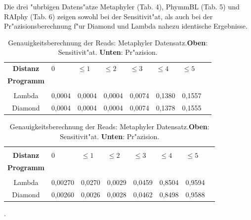 \documentclass[10pt, a4paper]{article}[08.12.2015]
\begin{document}
     Die drei "ubrbigen Datens"atze Metaphyler (Tab. 4), PhymmBL (Tab. 5) und RAIphy (Tab. 6) zeigen sowohl bei der Sensitivit"at, als auch bei der Pr"azisionsberechnung f"ur Diamond und Lambda nahezu identische Ergebnisse.
      \begin{table}[H]
        \begin{tabular}{clllllll}
          \textbf{Distanz}&0&$\leq1$&$\leq2$&$\leq3$&$\leq4$&$\leq5$\\
          \textbf{Programm}&&&&&\\ \hline  
          &&&&&&\\
          Lambda&0,0004&0,0004&0,0004&0,0074&0,1380&0,1557\\
          Diamond&0,0004&0,0004&0,0004&0,0074&0,1378&0,1555\\
        \end{tabular}

        \begin{tabular}{clllllll}
        &&&&&&\\
          \textbf{Distanz}&0&$\leq1$&$\leq2$&$\leq3$&$\leq4$&$\leq5$\\
          \textbf{Programm}&&&&&\\ \hline  
          &&&&&&\\
          Lambda&0,00270&0,0270&0,0029&0,0459&0,8504&0,9594\\
          Diamond&0,00260&0,0026&0,0028&0,0462&0,8498&0,9588\\
        \end{tabular}
        \caption[Genauigkeitsberechnung der Reads: Metaphyler Datensatz.]{\small{Genauigkeitsberechnung der Reads: Metaphyler Datensatz.\newline \textbf{Oben}: Sensitivit"at. \textbf{Unten}: Pr"azision.} }
      \end{table}
    .
\end{document}
